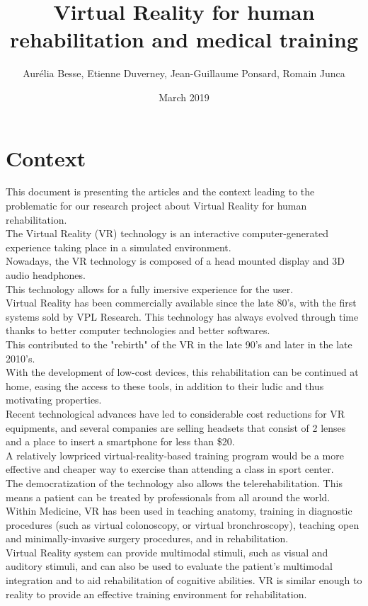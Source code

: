 \documentclass[12pt, openany, twocolumn]{article}
\title{Virtual Reality for human rehabilitation and medical training}
\author{ Aurélia Besse, Etienne Duverney, Jean-Guillaume Ponsard, Romain Junca }
\date{March 2019}
\begin{document}
\maketitle

\section{Context} 
\hspace{0.5cm}
This document is presenting the articles and the context leading to the problematic for our research project about Virtual Reality for human rehabilitation.
\\

The Virtual Reality (VR) technology is an interactive computer-generated experience taking place in a simulated environment. 
\\
Nowadays, the VR technology is composed of a head mounted display and 3D audio headphones.
\\
This technology allows for a fully imersive experience for the user.
\\

Virtual Reality has been commercially available since the late 80's, with the first systems sold by VPL Research.
This technology has always evolved through time thanks to better computer technologies and better softwares.
\\
This contributed to the "rebirth" of the VR in the late 90's and later in the late 2010's.
\\


With the development of low-cost devices, this rehabilitation can be continued at home, easing the access to these tools, in addition to their ludic and thus motivating properties.
\\ Recent technological advances have led to considerable cost reductions for VR equipments, and several companies are selling headsets that consist of 2 lenses and a place to insert a smartphone for less than \$20.
\\ A relatively lowpriced virtual-reality-based training program would be a more effective and cheaper way to exercise than attending a class in sport center.
\\ The democratization of the technology also allows the telerehabilitation. This means a patient can be treated by professionals from all around the world. 
\\

Within Medicine, VR has been used in teaching anatomy, training in diagnostic procedures (such as virtual colonoscopy, or virtual bronchroscopy), teaching open and minimally-invasive surgery procedures, and in rehabilitation. \\
Virtual Reality system can provide multimodal stimuli, such as visual and auditory stimuli, and can also be used to evaluate the patient’s multimodal integration and to aid rehabilitation of cognitive abilities. 
VR is similar enough to reality to provide an effective training environment for rehabilitation. \\
\end{document}
